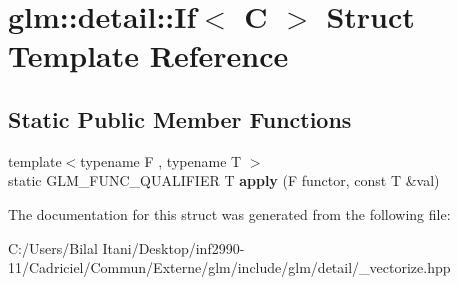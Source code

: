 \hypertarget{structglm_1_1detail_1_1_if}{}\section{glm\+:\+:detail\+:\+:If$<$ C $>$ Struct Template Reference}
\label{structglm_1_1detail_1_1_if}
\subsection*{Static Public Member Functions}
\begin{DoxyCompactItemize}
\item 
{\footnotesize template$<$typename F , typename T $>$ }\\static G\+L\+M\+\_\+\+F\+U\+N\+C\+\_\+\+Q\+U\+A\+L\+I\+F\+I\+ER T {\bfseries apply} (F functor, const T \&val)\hypertarget{structglm_1_1detail_1_1_if_ab66c77bac87f7ffe4aa6bb761b165746}{}\label{structglm_1_1detail_1_1_if_ab66c77bac87f7ffe4aa6bb761b165746}

\end{DoxyCompactItemize}


The documentation for this struct was generated from the following file\+:\begin{DoxyCompactItemize}
\item 
C\+:/\+Users/\+Bilal Itani/\+Desktop/inf2990-\/11/\+Cadriciel/\+Commun/\+Externe/glm/include/glm/detail/\+\_\+vectorize.\+hpp\end{DoxyCompactItemize}
